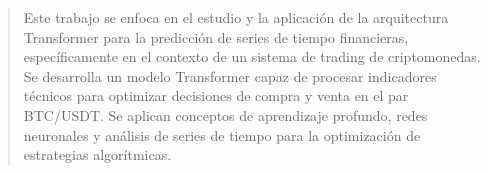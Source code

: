\documentclass[
    11pt,
    spanish,
    singlespacing,
    parskip,
    headsepline,
    bookmarks=true,
    unicode=true,
    pdftoolbar=true,
    pdfmenubar=true,
    pdffitwindow=false,
    colorlinks=true,
    linkcolor=blue,
    citecolor=blue,
    urlcolor=blue
]{MastersDoctoralThesis}
\begin{document}



\frontmatter %
\pagestyle{plain} %


\begin{abstract}
\addchaptertocentry{\abstractname} %
Este trabajo se enfoca en el estudio y la aplicación de la arquitectura Transformer para la predicción de series de tiempo financieras, específicamente en el contexto de un sistema de trading de criptomonedas. Se desarrolla un modelo Transformer capaz de procesar indicadores técnicos para optimizar decisiones de compra y venta en el par BTC/USDT. Se aplican conceptos de aprendizaje profundo, redes neuronales y análisis de series de tiempo para la optimización de estrategias algorítmicas.
\end{abstract}





\tableofcontents
\listoffigures
\listoftables




\mainmatter %
\pagestyle{thesis} %






\end{document}
